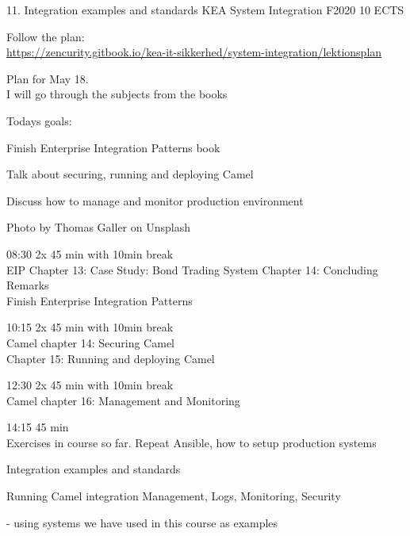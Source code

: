 \documentclass[Screen16to9,17pt]{foils}
\begin{document}
\mytitlepage
{11. Integration examples and standards}
{KEA System Integration F2020 10 ECTS}



\begin{list2}
\item Follow the plan:\\
\url{https://zencurity.gitbook.io/kea-it-sikkerhed/system-integration/lektionsplan}
\item Plan for May 18.\\
I will go through the subjects from the books
\end{list2}



Todays goals:
\begin{list2}
\item Finish Enterprise Integration Patterns book
\item Talk about securing, running and deploying Camel
\item Discuss how to manage and monitor production environment
\end{list2}

Photo by Thomas Galler on Unsplash


\begin{list2}
\item 08:30 2x 45 min with 10min break\\
EIP Chapter 13: Case Study: Bond Trading System
Chapter 14: Concluding Remarks\\
Finish Enterprise Integration Patterns
\item 10:15 2x 45 min with 10min break\\
Camel chapter 14: Securing Camel\\
Chapter 15: Running and deploying Camel
\item 12:30 2x 45 min with 10min break \\
Camel chapter 16: Management and Monitoring
\item 14:15 45 min\\
Exercises in course so far. Repeat Ansible, how to setup production systems
\end{list2}





\begin{list2}
\item Integration examples and standards
\item Running Camel integration Management, Logs, Monitoring, Security
\item - using systems we have used in this course as examples
\end{list2}
\end{document}
